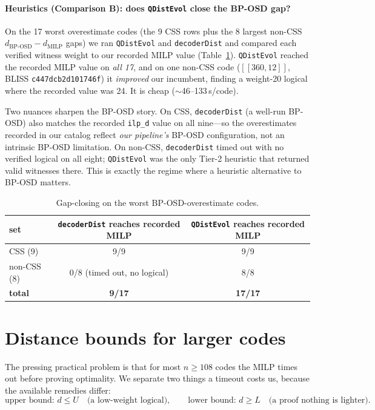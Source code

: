 \documentclass[11pt]{article}
\newcommand{\code}[1]{[\![#1]\!]}
\newcommand{\dleq}{d\!\le}
\begin{document}
\paragraph{Heuristics (Comparison B): does \texttt{QDistEvol} close the BP-OSD
gap?} On the 17 worst overestimate codes (the 9 CSS rows plus the 8 largest
non-CSS $d_{\text{BP-OSD}}-d_{\text{MILP}}$ gaps) we ran \texttt{QDistEvol} and
\texttt{decoderDist} and compared each verified witness weight to our recorded
MILP value (Table~\ref{tab:tier2}). \texttt{QDistEvol} reached the recorded MILP value on
\emph{all 17}, and on one non-CSS code ($\code{360,12}$, BLISS
\texttt{c447dcb2d101746f}) it \emph{improved} our incumbent, finding a weight-20
logical where the recorded value was 24. It is cheap ($\sim$46--133\,s/code).

Two nuances sharpen the BP-OSD story. On CSS, \texttt{decoderDist} (a well-run
BP-OSD) also matches the recorded \texttt{ilp\_d} value on all nine---so the
overestimates recorded in our catalog reflect \emph{our pipeline's} BP-OSD
configuration, not an intrinsic BP-OSD limitation. On non-CSS, \texttt{decoderDist}
timed out with no verified logical on all eight; \texttt{QDistEvol} was the only
Tier-2 heuristic that returned valid witnesses there. This is exactly the regime
where a heuristic alternative to BP-OSD matters.

\begin{table}[h]
\centering
\begin{tabular}{lcc}
\toprule
set & \texttt{decoderDist} reaches recorded MILP & \texttt{QDistEvol} reaches recorded MILP \\
\midrule
CSS (9) & 9/9 & 9/9 \\
non-CSS (8) & 0/8 (timed out, no logical) & 8/8 \\
\textbf{total} & \textbf{9/17} & \textbf{17/17} \\
\bottomrule
\end{tabular}
\caption{Gap-closing on the worst BP-OSD-overestimate codes.}
\label{tab:tier2}
\end{table}

\section{Distance bounds for larger codes}

The pressing practical problem is that for most $n\ge108$ codes the MILP times out
before proving optimality. We separate two things a timeout costs us, because the
available remedies differ:
\[
\text{upper bound: } \dleq U \quad\text{(a low-weight logical)},\qquad
\text{lower bound: } d\ge L \quad\text{(a proof nothing is lighter).}
\]
\end{document}
